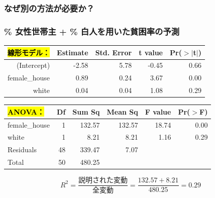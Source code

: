 
\begin{frame}
\frametitle{なぜ別の方法が必要か？}



\end{frame}


\begin{frame}
\frametitle{\% 女性世帯主 + \% 白人を用いた貧困率の予測}


\begin{center}
\begin{tabular}{rrrrr}
  \hline
\hl{線形モデル：}&  Estimate & Std. Error & t value & Pr($>$$|$t$|$) \\
  \hline
(Intercept) & -2.58 & 5.78 & -0.45 & 0.66 \\
  female\_house & 0.89 & 0.24 & 3.67 & 0.00 \\
  white & 0.04 & 0.04 & 1.08 & 0.29 \\
   \hline
\end{tabular}
\end{center}

\vspace{0.1cm}

\begin{center}
\begin{tabular}{lrrrrr}
  \hline
\hl{ANOVA：} & Df & Sum Sq & Mean Sq & F value & Pr($>$F) \\
  \hline
female\_house & 1 & 132.57 & 132.57 & 18.74 & 0.00 \\
  white & 1 & 8.21 & 8.21 & 1.16 & 0.29 \\
  Residuals & 48 & 339.47 & 7.07 &  &  \\
   \hline
Total & 50 &    480.25\\
   \hline
\end{tabular}
\end{center}

\[ R^2 = \frac{\text{説明された変動}}{\text{全変動}} = \frac{132.57 + 8.21}{480.25} = 0.29 \]

\end{frame}


